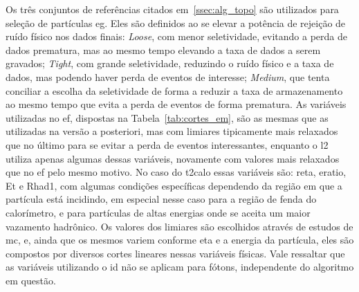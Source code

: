 

Os três conjuntos de referências citados em~\ref{ssec:alg_topo} são utilizados para 
seleção de partículas \gls{eg}. Eles são definidos ao se elevar a potência de rejeição 
de ruído físico nos dados finais: \emph{Loose}, com menor seletividade, 
evitando a perda de dados prematura, mas ao mesmo tempo elevando a taxa de dados 
a serem gravados; \emph{Tight}, com grande seletividade, reduzindo o
ruído físico e a taxa de dados, mas podendo haver perda de eventos de interesse;
\emph{Medium}, que tenta conciliar a escolha da seletividade de forma
a reduzir a taxa de armazenamento ao mesmo tempo que evita a perda de eventos
de forma prematura. As variáveis utilizadas no \gls{ef}, dispostas na
Tabela~\ref{tab:cortes_em}, são as mesmas que as
utilizadas na versão a posteriori, mas com limiares tipicamente mais relaxados
que no último para se evitar a perda de eventos interessantes, enquanto o
\gls{l2} utiliza apenas algumas dessas variáveis, novamente com valores mais relaxados que no 
\gls{ef} pelo mesmo motivo. No caso do \gls{t2calo} essas variáveis são: \gls{reta}, 
\gls{eratio}, \gls{Et} e \gls{Rhad1}, com algumas condições específicas 
dependendo da região em que a partícula está incidindo, em especial nesse 
caso para a região de fenda do calorímetro, e para partículas de altas energias onde se aceita um maior
vazamento hadrônico. Os valores dos limiares são escolhidos através de estudos
de \gls{mc}, e, ainda que os mesmos variem conforme \gls{eta} e a energia da
partícula, eles são compostos por diversos cortes lineares nessas variáveis
físicas. Vale ressaltar que as variáveis utilizando o \gls{id} 
não se aplicam para fótons, independente do algoritmo em questão.


